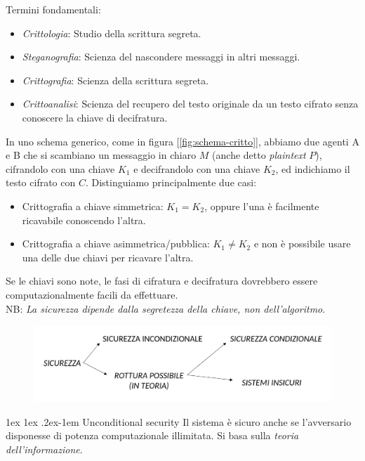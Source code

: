 \documentclass[a4paper, 11pt, twoside, openright, fleqn]{report}
\makeatletter
\renewcommand{\paragraph}{%
	\@startsection{paragraph}{4}%
	{\z@}{1ex \@plus 1ex \@minus .2ex}{-1em}%
	{\normalfont\normalsize\bfseries}%
}
\makeatother
\begin{document}
\noindent Termini fondamentali:
\begin{itemize}
	\item \emph{Crittologia}: Studio della scrittura segreta.
	\item \emph{Steganografia}: Scienza del nascondere messaggi in altri messaggi.
	\item \emph{Crittografia}: Scienza della scrittura segreta.
	\item \emph{Crittoanalisi}: Scienza del recupero del testo originale da un testo cifrato senza conoscere la chiave di decifratura.
\end{itemize}
In uno schema generico, come in figura [\ref{fig:schema-critto}], abbiamo due agenti A e B che si scambiano un messaggio in chiaro $M$ (anche detto \emph{plaintext} $P$), cifrandolo con una chiave $K_1$ e decifrandolo con una chiave $K_2$, ed indichiamo il testo cifrato con $C$. Distinguiamo principalmente due casi:
\begin{itemize}
	\item Crittografia a chiave simmetrica: $K_1 = K_2$, oppure l'una è facilmente ricavabile conoscendo l'altra.
	\item Crittografia a chiave asimmetrica/pubblica: $K_1 \neq K_2$ e non è possibile usare una delle due chiavi per ricavare l'altra.
\end{itemize}
Se le chiavi sono note, le fasi di cifratura e decifratura dovrebbero essere computazionalmente facili da effettuare.\\
NB: \emph{La sicurezza dipende dalla segretezza della chiave, non dell'algoritmo}.

\begin{figure}[htp]
	\centering
	\includegraphics[width=.8\textwidth]{images/Sicurezza_incondizionale.png}
\end{figure}

\paragraph{Unconditional security} Il sistema è sicuro anche se l'avversario disponesse di potenza computazionale illimitata. Si basa sulla \emph{teoria dell'informazione}.\\
\end{document}
